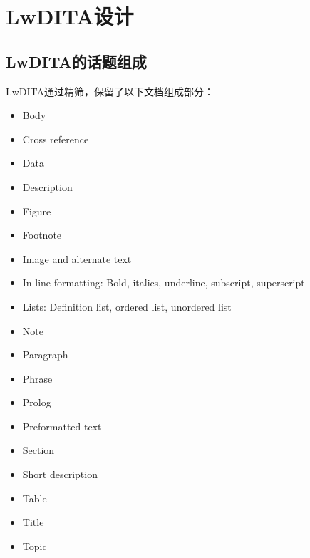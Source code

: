 \documentclass[letterpaper,10pt,english]{sphinxmanual}
\begin{document}
\chapter{LwDITA设计}
\label{\detokenize{chap3:lwdita}}\label{\detokenize{chap3::doc}}

\section{LwDITA的话题组成}
\label{\detokenize{chap3:id1}}
LwDITA通过精筛，保留了以下文档组成部分：
\begin{itemize}
\item {} 
Body

\item {} 
Cross reference

\item {} 
Data

\item {} 
Description

\item {} 
Figure

\item {} 
Footnote

\item {} 
Image and alternate text

\item {} 
In-line formatting: Bold, italics, underline, subscript, superscript

\item {} 
Lists: Definition list, ordered list, unordered list

\item {} 
Note

\item {} 
Paragraph

\item {} 
Phrase

\item {} 
Prolog

\item {} 
Preformatted text

\item {} 
Section

\item {} 
Short description

\item {} 
Table

\item {} 
Title

\item {} 
Topic

\end{itemize}
\end{document}

